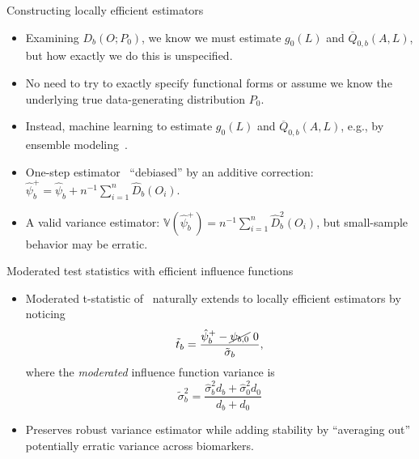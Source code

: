 \documentclass{beamer}
\begin{document}
\begin{frame}[c]{Constructing locally efficient estimators}

\begin{center}
\begin{itemize}
  \itemsep6pt
  \item Examining $D_b(O; P_0)$, we know we must estimate $g_0(L)$ and
    $\overline{Q}_{0,b}(A,L)$, but how exactly we do this is unspecified.
  \item No need to try to exactly specify functional forms or assume we know the
    underlying true data-generating distribution $P_0$.
  \item Instead, machine learning to estimate $g_0(L)$ and
    $\overline{Q}_{0,b}(A,L)$, e.g., by ensemble
    modeling~\citep{vdl2007super}.
  \item One-step estimator~\citep{bickel1993efficient} ``debiased'' by an
     additive correction: $\hat{\psi}_{b}^{+} = \hat{\psi}_{b} + n^{-1}
     \sum_{i=1}^n \hat{D}_b(O_i)$.
  \item A valid variance estimator: $\mathbb{V}(\hat{\psi}_b^{+}) = n^{-1}
    \sum_{i=1}^n \hat{D}_b^2(O_i)$, but small-sample behavior may be erratic.
\end{itemize}
\end{center}

\end{frame}


\begin{frame}[c]{Moderated test statistics with efficient influence functions}

\begin{center}
\begin{itemize}
  \itemsep6pt
  \item Moderated t-statistic of~\cite{smyth2004linear} naturally extends to
    locally efficient estimators by noticing
    \begin{equation*}
      \tilde{t}_b = \frac{\hat{\psi}_b^{+} - \cancel{\psi_{b,0}}{~0}}
      {\tilde{\sigma}_b},
    \end{equation*}
    where the \textit{moderated} influence function variance is
    \begin{equation*}
      \tilde{\sigma}^2_b = \frac{\hat{\sigma}^2_b d_b + \hat{\sigma}^2_0 d_0}
      {d_b + d_0}
    \end{equation*}
  \item Preserves robust variance estimator while adding stability by
    ``averaging out'' potentially erratic variance across biomarkers.
\end{itemize}
\end{center}

\note{
}
\end{frame}
\end{document}
